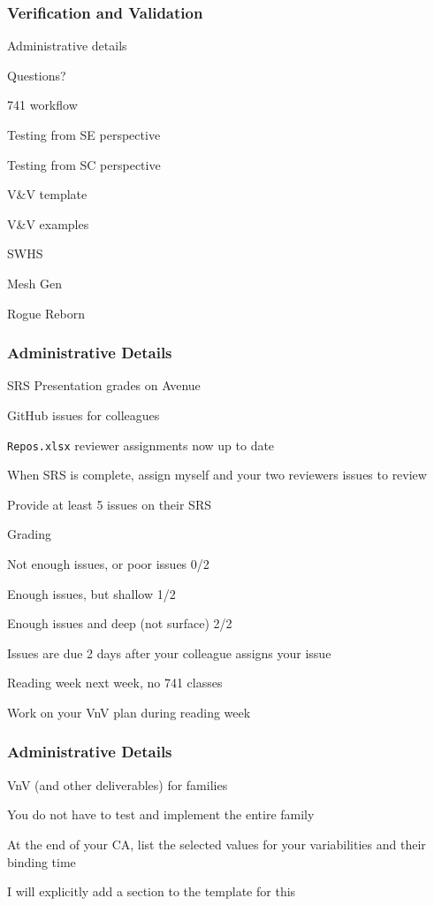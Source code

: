 \documentclass[t,12pt,numbers,fleqn]{beamer}
\begin{document}



\begin{frame}
\frametitle{Verification and Validation}

\bi
\item Administrative details
\item Questions?
\item 741 workflow
\item Testing from SE perspective
\item Testing from SC perspective
\item V\&V template
\item V\&V examples
\bi
\item SWHS
\item Mesh Gen
\item Rogue Reborn
\ei
\ei
\end{frame}


\begin{frame}
\frametitle{Administrative Details}

\bi
\item SRS Presentation grades on Avenue
\item GitHub issues for colleagues
\bi
\item \texttt{Repos.xlsx} reviewer assignments now up to date
\item When SRS is complete, assign myself and your two reviewers issues to
  review
\item Provide at least 5 issues on their SRS
\item Grading
\bi
\item Not enough issues, or poor issues 0/2
\item Enough issues, but shallow 1/2
\item Enough issues and deep (not surface) 2/2
\ei
\item Issues are due 2 days after your colleague assigns your issue
\ei
\item Reading week next week, no 741 classes
\item Work on your VnV plan during reading week
\ei

\end{frame}


\begin{frame}
\frametitle{Administrative Details}

\bi
\item VnV (and other deliverables) for families
  \bi
  \item You do not have to test and implement the entire family
  \item At the end of your CA, list the selected values for your variabilities
    and their binding time
  \item I will explicitly add a section to the template for this
  \ei
\ei

\end{frame}
\end{document}
